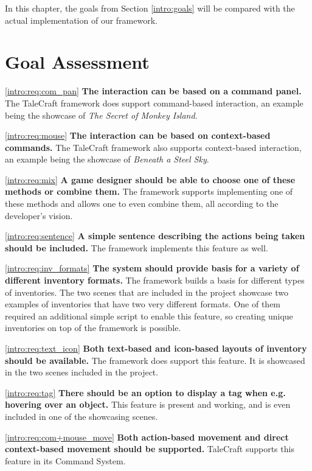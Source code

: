 In this chapter, the goals from Section \ref{intro:goals} will be compared with the actual implementation of our framework.


\section{Goal Assessment}

\hspace{0.5 cm} \ref{intro:req:com_pan} \quad \textbf{The interaction can be based on a command panel.} The TaleCraft framework does support command-based interaction, an example being the showcase of \textit{The Secret of Monkey Island}.

\ref{intro:req:mouse} \quad  \textbf{The interaction can be based on context-based commands. } The TaleCraft framework also supports context-based interaction, an example being the showcase of \textit{Beneath a Steel Sky}.

\ref{intro:req:mix} \quad  \textbf{A game designer should be able to choose one of these methods or combine them.} The framework supports implementing one of these methods and allows one to even combine them, all according to the developer's vision.

\ref{intro:req:sentence} \quad  \textbf{A simple sentence describing the actions being taken should be included.} The framework implements this feature as well.

\ref{intro:req:inv_formats} \quad  \textbf{The system should provide basis for a variety of different inventory formats.} The framework builds a basis for different types of inventories. The two scenes that are included in the project showcase two examples of inventories that have two very different formats. One of them required an additional simple script to enable this feature, so creating unique inventories on top of the framework is possible.

\ref{intro:req:text_icon} \quad  \textbf{Both text-based and icon-based layouts of inventory should be available.} The framework does support this feature. It is showcased in the two scenes included in the project.

\ref{intro:req:tag} \quad  \textbf{There should be an option to display a tag when e.g. hovering over an object.} This feature is present and working, and is even included in one of the showcasing scenes.

\ref{intro:req:com+mouse_move} \quad  \textbf{Both action-based movement and direct context-based movement should be supported.} TaleCraft supports this feature in its Command System.

